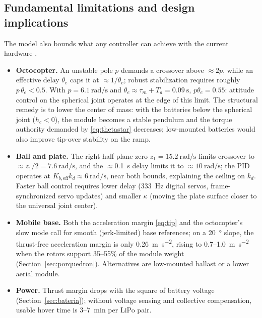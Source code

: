 \subsection{Fundamental limitations and design implications}
\label{sec:limits_fund}
The model also bounds what any controller can achieve with the current hardware \cite{skogestad2005}.
\begin{itemize}
  \item \textbf{Octocopter.} An unstable pole $p$ demands a crossover above $\approx2p$, while an effective delay $\theta_e$ caps it at $\approx1/\theta_e$; robust stabilization requires roughly $p\,\theta_e<0.5$. With $p=\SI{6.1}{\radian\per\second}$ and $\theta_e\approx\tau_m+T_a=\SI{0.09}{\second}$, $p\theta_e=0.55$: attitude control on the spherical joint operates at the edge of this limit. The structural remedy is to lower the center of mass: with the batteries below the spherical joint ($h_c<0$), the module becomes a stable pendulum and the torque authority demanded by \eqref{eq:thetastar} decreases; low-mounted batteries would also improve tip-over stability on the ramp.
  \item \textbf{Ball and plate.} The right-half-plane zero $z_1=\SI{15.2}{\radian\per\second}$ limits crossover to $\approx z_1/2=\SI{7.6}{\radian\per\second}$, and the $\approx$\SI{0.1}{\second} delay limits it to $\approx\SI{10}{\radian\per\second}$; the PID operates at $K_{b,\mathrm{eff}}k_d\approx\SI{6}{\radian\per\second}$, near both bounds, explaining the ceiling on $k_d$. Faster ball control requires lower delay (\SI{333}{\hertz} digital servos, frame-synchronized servo updates) and smaller $\kappa$ (moving the plate surface closer to the universal joint center).
  \item \textbf{Mobile base.} Both the acceleration margin \eqref{eq:tip} and the octocopter's slow mode call for smooth (jerk-limited) base references; on a \SI{20}{\degree} slope, the thrust-free acceleration margin is only \SI{0.26}{\metre\per\second\squared}, rising to 0.7--\SI{1.0}{\metre\per\second\squared} when the rotors support 35--55\% of the module weight (Section~\ref{sec:porquedron}). Alternatives are low-mounted ballast or a lower aerial module.
  \item \textbf{Power.} Thrust margin drops with the square of battery voltage (Section~\ref{sec:bateria}); without voltage sensing and collective compensation, usable hover time is 3--\SI{7}{\minute} per LiPo pair.
\end{itemize}
